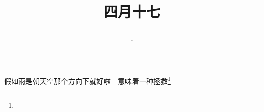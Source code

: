 \title{\date[d=24,m=5,y=2024][year:cn-y,年,month:cn,day:cn,日,·,weekday]·四月十七 }
假如雨是朝天空那个方向下就好啦　意味着一种拯救\footnote{ }

